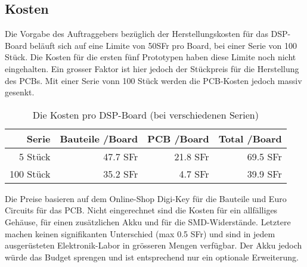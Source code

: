 \subsection{Kosten}
\label{sec:Kosten}

Die Vorgabe des Auftraggebers bezüglich der Herstellungskosten für das DSP-Board beläuft sich auf eine Limite von 50SFr pro Board, bei einer Serie von 100 Stück. Die Kosten für die ersten fünf Prototypen haben diese Limite noch nicht eingehalten. Ein grosser Faktor ist hier jedoch der Stückpreis für die Herstellung des PCBs. Mit einer Serie vonn 100 Stück werden die PCB-Kosten jedoch massiv gesenkt.

\begin{table}[H]
	\centering
	\begin{tabular}{|r|r|r|r|}
		\hline
		\textbf{Serie} & \textbf{Bauteile /Board}             & \textbf{PCB /Board} & \textbf{Total /Board} \\ \hline
		5 Stück              &           47.7 SFr      & 21.8 SFr & 69.5 SFr    \\ \hline
		100 Stück           & 35.2 SFr                       & 4.7 SFr  & 39.9 SFr    \\ \hline
	\end{tabular}
	\caption{Die Kosten pro DSP-Board (bei verschiedenen Serien)}
	\label{tab:kosten}
\end{table}


Die Preise basieren auf dem Online-Shop Digi-Key \cite{www:digikey} für die Bauteile und Euro Circuits \cite{www:eurocircuits} für das PCB.
Nicht eingerechnet  sind die Kosten für ein allfälliges Gehäuse, für einen zusätzlichen Akku und für die SMD-Widerstände. Letztere machen keinen signifikanten Unterschied (max 0.5 SFr) und sind in jedem ausgerüsteten Elektronik-Labor in grösseren Mengen verfügbar. Der Akku jedoch würde das Budget sprengen und ist entsprechend nur ein optionale Erweiterung.